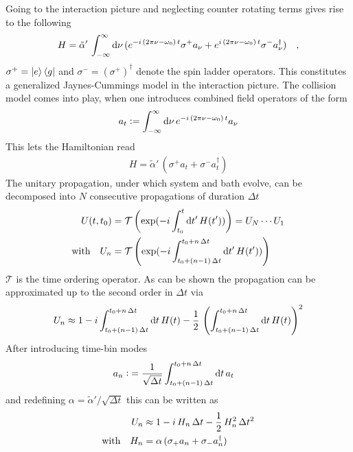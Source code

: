 Going to the interaction picture and neglecting counter rotating terms gives rise to the following
\begin{align*}
    H=\tilde{\alpha}'\,\int_{-\infty}^\infty\text{d}\nu\,(e^{-i\,(2\pi\nu-\omega_0)\, t}\sigma^+a_\nu+e^{i\,(2\pi\nu-\omega_0)\, t}\sigma^-a^\dagger_\nu)\quad,
\end{align*}
$\sigma^+=\ket{e}\bra{g}$ and $\sigma^-=(\sigma^+)^\dagger$ denote the spin ladder operators. This constitutes a generalized Jaynes-Cummings model in the interaction picture. The collision model comes into play, when one introduces combined field operators of the form
\begin{align*}
    a_t\vcentcolon=\int_{-\infty}^{\infty}\text{d}\nu\,e^{-i\,(2\pi\nu-\omega_0)\, t}a_\nu
\end{align*}
This lets the Hamiltonian read
\begin{align*}
    H= \tilde{\alpha}'\,(\sigma^+a_t+\sigma^-a^\dagger_t)
\end{align*}
The unitary propagation, under which system and bath evolve, can be decomposed into $N$ consecutive propagations of duration $\Delta t$
\begin{align*}
    U(t,t_0)&=\mathcal{T}\left(  \exp(-i\int_{t_0}^t\text{d} t'\,H(t'))  \right)=U_{N}\cdots U_1\\
    \text{with}\quad U_n&=\mathcal{T}\left( \exp(-i\int_{t_0+(n-1)\,\Delta t}^{t_0+n\,\Delta t}\text{d} t'\,H(t'))  \right)
\end{align*}
$\mathcal{T}$ is the time ordering operator.
As can be shown \cite{ciccarello_quantum_2022} the propagation can be approximated up to the second order in $\Delta t$ via
\begin{align*}
    U_n \approx 1-i\int_{t_0+(n-1)\,\Delta t}^{t_0+n\,\Delta t}\text{d} t \,H(t) - \frac{1}{2}\,\left(\int_{t_0+(n-1)\,\Delta t}^{t_0+n\,\Delta t}\text{d} t \,H(t)\right)^2
\end{align*}
After introducing time-bin modes
\begin{align*}
    a_n\vcentcolon&=\frac{1}{\sqrt{\Delta t}}\int_{t_0+(n-1)\,\Delta t}^{t_0+n\,\Delta t}\text{d} t\,a_t
\end{align*}
and redefining $\alpha=\tilde{\alpha}'/\sqrt{\Delta t}$ this can be written as
\begin{align}\label{eq:approx_time_evolv}
    U_n &\approx 1-i\,H_n \,\Delta t-\frac{1}{2}\,H_n^2\,\Delta t^2\notag\\
    \text{with}\quad H_n&=\alpha\,(\sigma_+a_n+\sigma_-a^\dagger_n)
\end{align}
